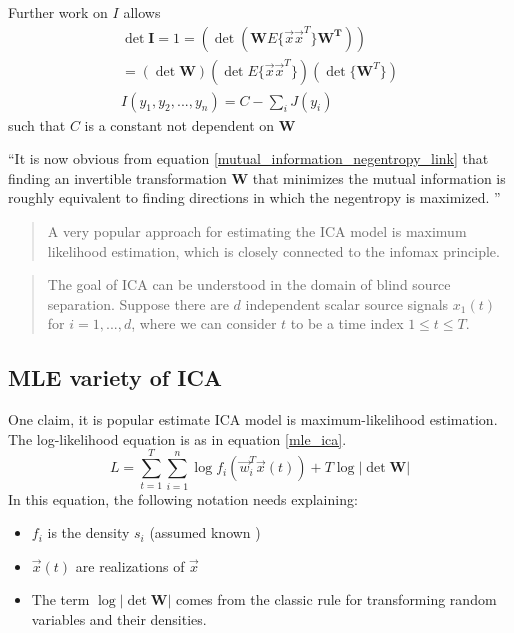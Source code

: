 \documentclass[]{article}
\begin{document}
Further work on $I$ allows 
\begin{eqnarray}
\det \mathbf{I} = 1 = ( \det(\mathbf{W} E\{ \vec{x} \vec{x}^T\} \mathbf{W^T})) \\
= (\det \mathbf{W}) (\det E \{ \vec{x}\vec{x}^T \}) (\det \{\mathbf{W}^T \}) \\
I(y_1, y_2, ..., y_n) = C - \sum_i J(y_i) \label{mutual_information_negentropy_link}
\end{eqnarray}
such that $C$ is a constant not dependent on $\mathbf{W}$


``It is now obvious from equation \ref{mutual_information_negentropy_link} that finding an invertible transformation $\mathbf{W}$  that minimizes the mutual information is roughly equivalent to finding directions in which the negentropy is maximized. '' \cite[10]{helsinki}


\begin{quote}
A very popular approach for estimating the ICA model is maximum likelihood estimation, which is closely connected to the infomax principle. \cite[10]{helsinki}
\end{quote}


\begin{quote}
	The goal of ICA can be understood in the domain of blind source separation.  Suppose there are $d$ independent scalar source signals $x_1 (t)$ for $i = 1, ..., d$, where we can consider $t$ to be a time index $1 \le t \le T$. %
\cite[570]{duda-hart-stork}
\end{quote}

\subsection{MLE variety of ICA}

One claim, it is popular estimate ICA model is maximum-likelihood estimation.  The log-likelihood equation is as in equation \ref{mle_ica}.  
\begin{equation}
	L = \sum_{t=1} ^{T} \sum_{i=1}^n \log f_i (\vec{w}_i^T \vec{x}(t)) + T \log | \det \mathbf{W} | \label{mle_ica}
\end{equation}
In this equation, the following notation needs explaining:
\begin{itemize}
	\item $f_i$ is the density $s_i$ (assumed known )
	\item $\vec{x}(t)$ are realizations of $\vec{x}$
	\item The term $\log | \det \mathbf{W}|$ comes from the classic rule for transforming random variables and their densities. 
\end{itemize}
\end{document}
